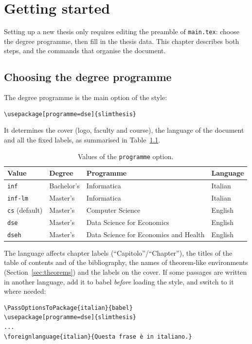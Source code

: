 \chapter{Getting started} \label{ch1}

Setting up a new thesis only requires editing the preamble of
\texttt{main.tex}: choose the degree programme, then fill in the thesis
data. This chapter describes both steps, and the commands that organise the
document.

\section{Choosing the degree programme} \label{sec:programme}

The degree programme is the main option of the style:
\begin{Verbatim}
\usepackage[programme=dse]{slimthesis}
\end{Verbatim}
It determines the cover (logo, faculty and course), the language of the
document and all the fixed labels, as summarised in
Table~\ref{tab:programmes}.

\begin{table}[htbp]
  \centering
  \caption{Values of the \texttt{programme} option.}
  \label{tab:programmes}
  \begin{tabular}{llll}
    \toprule
    Value & Degree & Programme & Language \\
    \midrule
    \texttt{inf}    & Bachelor's & Informatica & Italian \\
    \texttt{inf-lm} & Master's & Informatica & Italian \\
    \texttt{cs} (default) & Master's & Computer Science & English \\
    \texttt{dse}    & Master's & Data Science for Economics & English \\
    \texttt{dseh}   & Master's & Data Science for Economics and Health & English \\
    \bottomrule
  \end{tabular}
\end{table}

The language affects chapter labels (``Capitolo''/``Chapter''), the titles of
the table of contents and of the bibliography, the names of theorem-like
environments (Section~\ref{sec:theorems}) and the labels on the cover. If
some passages are written in another language, add it to babel
\emph{before} loading the style, and switch to it where needed:
\begin{Verbatim}
\PassOptionsToPackage{italian}{babel}
\usepackage[programme=dse]{slimthesis}
...
\foreignlanguage{italian}{Questa frase è in italiano.}
\end{Verbatim}

